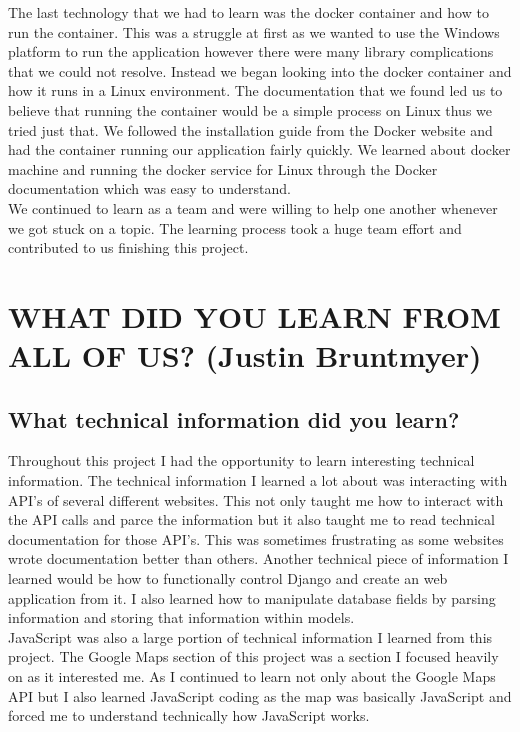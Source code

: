 \documentclass[draftclsnofoot,10pt,onecolumn]{IEEEtran} %
\begin{document}
The last technology that we had to learn was the docker container and how to run the container. This was a struggle at first as 
we wanted to use the Windows platform to run the application however there were many library complications that we could not 
resolve. Instead we began looking into the docker container and how it runs in a Linux environment. The documentation that we 
found led us to believe that running the container would be a simple process on Linux thus we tried just that. We followed 
the installation guide from the Docker website and had the container running our application fairly quickly. We learned about 
docker machine and running the docker service for Linux through the Docker documentation which was easy to understand. \\

We continued to learn as a team and were willing to help one another whenever we got stuck on a topic. The learning process 
took a huge team effort and contributed to us finishing this project. \\



\section{WHAT DID YOU LEARN FROM ALL OF US? (Justin Bruntmyer)}

\subsection{What technical information did you learn?}
Throughout this project I had the opportunity to learn interesting technical information. The technical information I learned 
a lot about was interacting with API's of several different websites. This not only taught me how to interact with the API
calls and parce the information but it also taught me to read technical documentation for those API's. This was sometimes
frustrating as some websites wrote documentation better than others. Another technical piece of information I learned would
be how to functionally control Django and create an web application from it. I also learned how to manipulate database fields
by parsing information and storing that information within models. \\

JavaScript was also a large portion of technical information I learned from this project. The Google Maps section of this project
was a section I focused heavily on as it interested me. As I continued to learn not only about the Google Maps API but I also 
learned JavaScript coding as the map was basically JavaScript and forced me to understand technically how JavaScript works. \\
\end{document}
